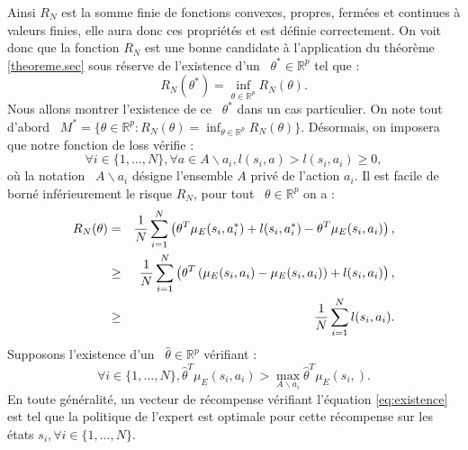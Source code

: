 \documentclass[publibook-draft]{CAp2012}
\begin{document}
Ainsi $R_N$ est la somme finie de fonctions convexes, propres, fermées et continues à valeurs finies, elle aura donc ces propriétés et est définie correctement. On voit donc que la fonction $R_N$ est une bonne candidate à l'application du théorème \ref{theoreme.sec} sous réserve de l'existence d'un ~$\theta^*\in\mathbb{R}^p$ tel que :
\begin{equation}
R_N(\theta^*)=\inf_{\theta \in \mathbb{R}^p}R_N(\theta).
\end{equation}
Nous allons montrer l'existence de ce ~$\theta^*$ dans un cas particulier. On note tout d'abord ~$M^*=\{\theta\in\mathbb{R}^p:R_N(\theta)=\inf_{\theta \in \mathbb{R}^p}R_N(\theta)\}$.
Désormais, on imposera que notre fonction de loss vérifie :
\begin{equation}
\forall i\in\{1,\dots,N\}, \forall a \in A \backslash a_i, l(s_i,a)>l(s_i,a_i)\geq0,
\end{equation}
où la notation ~$A \backslash a_i$ désigne l'ensemble $A$ privé de l'action $a_i$.
Il est facile de borné inférieurement le risque $R_N$, pour tout ~$\theta\in\mathbb{R}^p$ on a :
\begin{eqnarray}
   R_N(\theta) &=& {1\over N} \sum_{i=1}^N\left(\theta ^T \mu_E(s_i,a^*_i) + l(s_i,a^*_i) - \theta ^T \mu_E(s_i,a_i) \right),\\
   &\geq& {1\over N} \sum_{i=1}^N\left(\theta^T\left(\mu_E(s_i,a_i) - \mu_E(s_i,a_i)\right) + l(s_i,a_i)  \right),\\
   &\geq& {1\over N} \sum_{i=1}^Nl(s_i,a_i).
\end{eqnarray}
Supposons l'existence d'un ~$\hat{\theta}\in\mathbb{R}^p$ vérifiant :
\begin{equation}\label{eq:existence}
\forall i\in\{1,\dots,N\}, \hat{\theta}^T\mu_E(s_i,a_i)>\max_{A \backslash a_i}\hat{\theta}^T\mu_E(s_i,).
\end{equation}
En toute généralité, un vecteur de récompense vérifiant l'équation \eqref{eq:existence} est tel que la politique de l'expert est optimale pour cette récompense sur les états
$s_i, \forall i\in\{1,\dots,N\}$.\\
\end{document}
